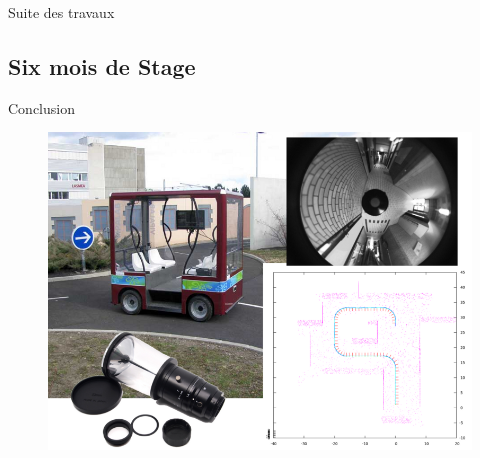 \documentclass{beamer}
\begin{document}
\begin{frame}{Suite des travaux}
\end{frame}

\subsection*{Six mois de Stage}
\begin{frame}{Conclusion}
  \begin{figure}
    \includegraphics[width=0.7\linewidth]{images/conclusion.png}
  \end{figure}
\end{frame}
\end{document}
